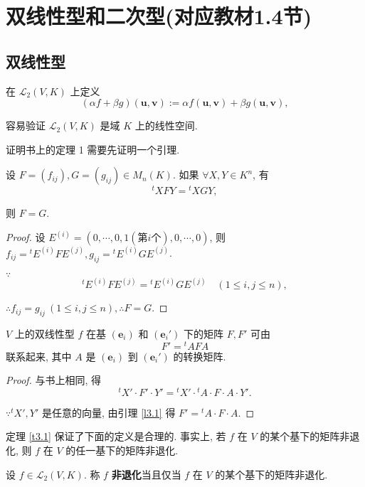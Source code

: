 \documentclass[color=black,device=normal,lang=cn,mode=geye]{elegantnote}
\begin{document}
\section{双线性型和二次型(对应教材1.4节)}
\subsection{双线性型}
在 $\mathcal{L}_2(V,K)$ 上定义
\[(\alpha f+\beta g)(\boldsymbol{u},\boldsymbol{v}):=\alpha f(\boldsymbol{u},\boldsymbol{v})+\beta g(\boldsymbol{u},\boldsymbol{v}),\]

容易验证 $\mathcal{L}_2(V,K)$ 是域 $K$ 上的线性空间.

证明书上的定理 1 需要先证明一个引理.
\begin{lemma}\label{l3.1}
    设 $F=(f_{ij}),G=(g_{ij})\in M_n(K)$. 如果 $\forall X,Y\in K^n$, 有
    \[{}^tXFY={}^tXGY,\]

    则 $F=G$.
\end{lemma}
\begin{proof}
    设 $E^{(i)}=(0,\cdots,0,1(\text{第}i\text{个}),0,\cdots,0)$, 则 $f_{ij}={}^tE^{(i)}FE^{(j)},g_{ij}={}^tE^{(i)}GE^{(j)}$.

    $\because$
    \[{}^tE^{(i)}FE^{(j)}={}^tE^{(i)}GE^{(j)}\quad(1\leq i,j\leq n),\]

    $\therefore f_{ij}=g_{ij}\ (1\leq i,j\leq n),\therefore F=G$.
\end{proof}
\begin{theorem}[书上的定理 1]\label{t3.1}
    $V$ 上的双线性型 $f$ 在基 $(\boldsymbol{e}_i)$ 和 $(\boldsymbol{e}_i')$ 下的矩阵 $F,F'$ 可由
    \[F'={}^tAFA\]
    联系起来, 其中 $A$ 是 $(\boldsymbol{e}_i)$ 到 $(\boldsymbol{e}_i')$ 的转换矩阵.
\end{theorem}
\begin{proof}
    与书上相同, 得
    \[{}^tX'\cdot F'\cdot Y'={}^tX'\cdot{}^tA\cdot F\cdot A\cdot Y'.\]

    $\because{}^tX',Y'$ 是任意的向量, 由引理 \ref{l3.1} 得 $F'={}^tA\cdot F\cdot A$.
\end{proof}
定理 \ref{t3.1} 保证了下面的定义是合理的. 事实上, 若 $f$ 在 $V$ 的某个基下的矩阵非退化, 则 $f$ 在 $V$ 的任一基下的矩阵非退化.
\begin{definition}
    设 $f\in\mathcal{L}_2(V,K)$. 称 $f$ \textbf{非退化}当且仅当 $f$ 在 $V$ 的某个基下的矩阵非退化.
\end{definition}
\end{document}
